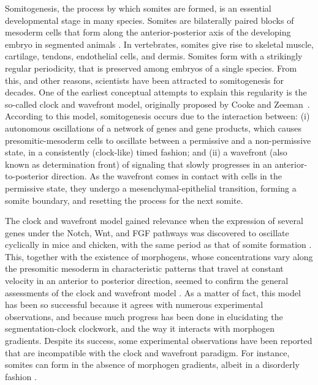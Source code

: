 \documentclass[%
 preprint,
 aip, 
 amsmath,amssymb,
]{revtex4-2}
\begin{document}
Somitogenesis, the process by which somites are formed, is an essential developmental stage in many species. Somites are bilaterally paired blocks of mesoderm cells that form along the anterior-posterior axis of the developing embryo in segmented animals \cite{Maroto2012}. In vertebrates, somites give rise to skeletal muscle, cartilage, tendons, endothelial cells, and dermis. Somites form with a strikingly regular periodicity, that is preserved among embryos of a single species. From this, and other reasons, scientists have been attracted to somitogenesis for decades. One of the earliest conceptual attempts to explain this regularity is the so-called clock and wavefront model, originally proposed by Cooke and Zeeman~\cite{Cooke1976}. According to this model, somitogenesis occurs due to the interaction between: (i) autonomous oscillations of a network of genes and gene products, which causes presomitic-mesoderm cells to oscillate between a permissive and a non-permissive state, in a consistently (clock-like) timed fashion; and (ii) a wavefront (also known as determination front) of signaling that slowly progresses in an anterior-to-posterior direction. As the wavefront comes in contact with cells in the permissive state, they undergo a mesenchymal-epithelial transition, forming a somite boundary, and resetting the process for the next somite.
	
The clock and wavefront model gained relevance when the expression of several genes under the Notch, Wnt, and FGF pathways was discovered to oscillate cyclically in mice and chicken, with the same period as that of somite formation \cite{Palmeirim1997, Pourquie2001, Gibb2010, Pourquie2011}. This, together with the existence of morphogens, whose concentrations vary along the presomitic mesoderm in characteristic patterns that travel at constant velocity in an anterior to posterior direction, seemed to confirm the general assessments of the clock and wavefront model \cite{Gibb2010, Pourquie2011, Dubrulle2001}. As a matter of fact, this model has been so successful because it agrees with numerous experimental observations, and because much progress has been done in elucidating the segmentation-clock clockwork, and the way it interacts with morphogen gradients. Despite its success, some experimental observations have been reported that are incompatible with the clock and wavefront paradigm. For instance, somites can form in the absence of morphogen gradients, albeit in a disorderly fashion \cite{Naiche2011,Dias2014}.
	
\end{document}
